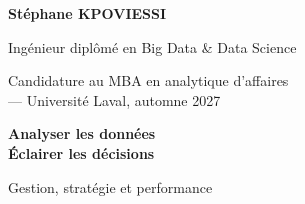 \documentclass[10pt,a4paper]{article}
\begin{document}
\fontsize{10pt}{12.6pt}\selectfont
\begin{minipage}[t]{0.55\textwidth}
{\fontsize{22pt}{25pt}\selectfont\bfseries\color{accent}Stéphane KPOVIESSI}\par
Ingénieur diplômé en Big Data \& Data Science\par
{\color{muted}Candidature au MBA en analytique d'affaires\\--- Université Laval, automne 2027}
\end{minipage}\hfill
\begin{minipage}[t]{0.40\textwidth}
\raggedleft
{\bfseries\color{accent}Analyser les données\\Éclairer les décisions}\par
\vspace{4pt}
{\color{muted}Gestion, stratégie et performance}
\end{minipage}
\vspace{7pt}
\vspace{1pt}
\vspace{8pt}
\end{document}
